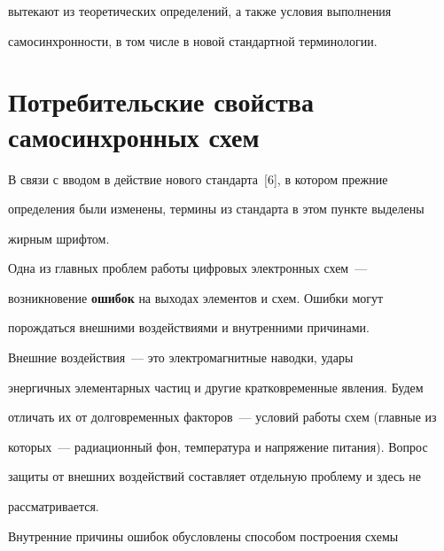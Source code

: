 вытекают из теоретических определений, а также условия выполнения 


самосинхронности, в том числе в новой стандартной терминологии.







      


      \section{Потребительские свойства самосинхронных схем}


      




      


      В связи с вводом в действие нового стандарта~[6], в котором прежние 


определения были изменены, термины из стандарта в этом пункте выделены 


жирным шрифтом.


      


      Одна из главных проблем работы цифровых электронных схем~--- 


возникновение \textbf{ошибок} на выходах элементов и схем. Ошибки могут 


порождаться внешними воздействиями и внутренними причинами.


      


      Внешние воздействия~--- это электромагнитные наводки, удары 


энергичных элементарных частиц и другие кратковременные явления. Будем 


отличать их от долговременных факторов~--- условий работы схем (главные из 


которых~--- радиационный фон, температура и напряжение питания). Вопрос 


защиты от внешних воздействий составляет отдельную проблему и здесь не 


рассматривается.


      


      Внутренние причины ошибок обусловлены способом построения схемы 


